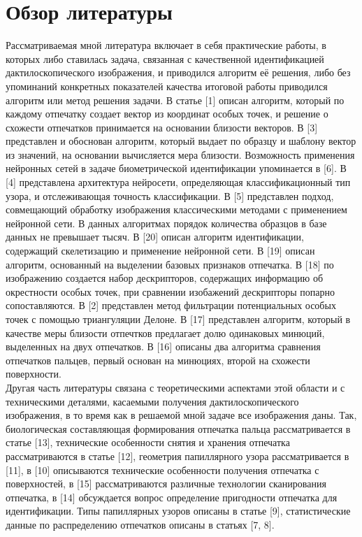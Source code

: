 \documentclass{article}
\begin{document}
\section{Обзор литературы}
Рассматриваемая мной литература включает в себя практические работы, в которых либо ставилась задача, связанная с качественной идентификацией дактилоскопического изображения, и приводился алгоритм её решения, либо без упоминаний конкретных показателей качества итоговой работы приводился алгоритм или метод решения задачи.
В статье [1] описан алгоритм, который по каждому отпечатку создает вектор из координат особых точек, и решение о схожести отпечатков принимается на основании близости векторов. В [3] представлен и обоснован алгоритм, который выдает по образцу и шаблону вектор из значений, на основании вычисляется мера близости. Возможность применения нейронных сетей в задаче биометрической идентификации упоминается в [6]. В [4] представлена архитектура нейросети, определяющая классификационный тип узора, и отслеживающая точность классификации. В [5] представлен подход, совмещающий обработку изображения классическими методами с применением нейронной сети. В данных алгоритмах порядок количества образцов в базе данных не превышает тысяч. В [20] описан алгоритм идентификации, содержащий скелетизацию и применение нейронной сети. В [19] описан алгоритм, основанный на выделении базовых признаков отпечатка. В [18] по изображению создается набор дескрипторов, содержащих информацию об окрестности особых точек, при сравнении изобажений дескрипторы попарно сопоставляются. В [2] представлен метод фильтрации потенциальных особых точек с помощью триангуляции Делоне. В [17] представлен алгоритм, который в качестве меры близости отпечтков предлагает долю одинаковых минюций, выделенных на двух отпечатков. В [16] описаны два алгоритма сравнения отпечатков пальцев, первый основан на минюциях, второй на схожести поверхности.  \\
Другая часть литературы связана с теоретическими аспектами этой области и с техническими деталями, касаемыми получения дактилоскопического изображения, в то время как в решаемой мной задаче все изображения даны. Так, биологическая составляющая формирования отпечатка пальца рассматривается в статье [13], технические особенности снятия и хранения отпечатка рассматриваются в статье [12], геометрия папиллярного узора рассматривается в [11], в [10] описываются технические особенности получения отпечатка с поверхностей, в [15] рассматриваются различные технологии сканирования отпечатка, в [14] обсуждается вопрос определение пригодности отпечатка для идентификации. Типы папиллярных узоров описаны в статье [9], статистические данные по распределению отпечатков описаны в статьях [7, 8].
\end{document}
